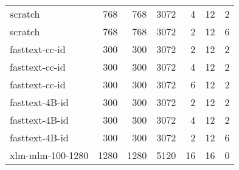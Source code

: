 \begin{tabular}{lrrrrrr}
                           scratch &             768 &          768 &               3072 &                  4 &       12 &                2 \\
                           scratch &             768 &          768 &               3072 &                  2 &       12 &                6 \\
                    fasttext-cc-id &             300 &          300 &               3072 &                  2 &       12 &                2 \\
                    fasttext-cc-id &             300 &          300 &               3072 &                  4 &       12 &                2 \\
                    fasttext-cc-id &             300 &          300 &               3072 &                  6 &       12 &                2 \\
                    fasttext-4B-id &             300 &          300 &               3072 &                  2 &       12 &                2 \\
                    fasttext-4B-id &             300 &          300 &               3072 &                  4 &       12 &                2 \\
                    fasttext-4B-id &             300 &          300 &               3072 &                  2 &       12 &                6 \\
                  xlm-mlm-100-1280 &            1280 &         1280 &               5120 &                 16 &       16 &                0 \\
\bottomrule
\end{tabular}
